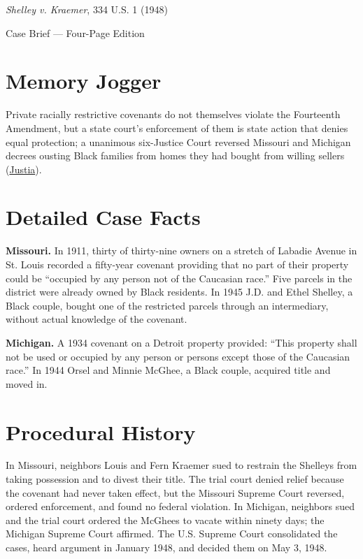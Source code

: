 \documentclass[12pt]{article}
\begin{document}
\begin{center}
{\LARGE \textit{Shelley v. Kraemer}, 334 U.S. 1 (1948)\par}
\vspace{0.8em}
{\large Case Brief --- Four-Page Edition\par}
\end{center}
\vspace{1em}

\section{Memory Jogger}

Private racially restrictive covenants do not themselves violate the Fourteenth Amendment, but a state court's enforcement of them is state action that denies equal protection; a unanimous six-Justice Court reversed Missouri and Michigan decrees ousting Black families from homes they had bought from willing sellers (\href{https://supreme.justia.com/cases/federal/us/334/1/}{Justia}).

\section{Detailed Case Facts}

\textbf{Missouri.} In 1911, thirty of thirty-nine owners on a stretch of Labadie Avenue in St. Louis recorded a fifty-year covenant providing that no part of their property could be ``occupied by any person not of the Caucasian race.'' Five parcels in the district were already owned by Black residents. In 1945 J.D. and Ethel Shelley, a Black couple, bought one of the restricted parcels through an intermediary, without actual knowledge of the covenant.

\textbf{Michigan.} A 1934 covenant on a Detroit property provided: ``This property shall not be used or occupied by any person or persons except those of the Caucasian race.'' In 1944 Orsel and Minnie McGhee, a Black couple, acquired title and moved in.

\section{Procedural History}

In Missouri, neighbors Louis and Fern Kraemer sued to restrain the Shelleys from taking possession and to divest their title. The trial court denied relief because the covenant had never taken effect, but the Missouri Supreme Court reversed, ordered enforcement, and found no federal violation. In Michigan, neighbors sued and the trial court ordered the McGhees to vacate within ninety days; the Michigan Supreme Court affirmed. The U.S. Supreme Court consolidated the cases, heard argument in January 1948, and decided them on May 3, 1948.
\end{document}
